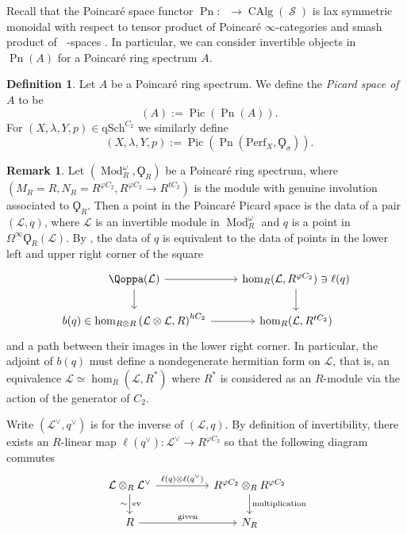 \documentclass{article}
\DeclareMathOperator{\CAlg}{CAlg} %
\DeclareMathOperator{\Catp}{Cat^p_\infty} %
\DeclareMathOperator{\Einfty}{\mathbf{E}_\infty} %
\DeclareMathOperator{\Mod}{Mod} %
\DeclareMathOperator{\Pic}{Pic} %
\DeclareMathOperator{\Picp}{Pic^p} %
\DeclareMathOperator{\Pn}{Pn} %
\DeclareMathOperator{\Spaces}{\mathcal{S}} %
\newcommand{\perf}{\mathrm{Perf}}
\theoremstyle{definition}
\newtheorem{definition}[equation]{Definition}
\newtheorem{remark}[equation]{Remark}
\newcommand{\Lucy}[1]{\todo[color=cyan!30]{\linespread{1}\footnotesize L: #1}}
\begin{document}
Recall that the Poincaré space functor $ \Pn \colon \Catp \to \CAlg(\Spaces) $ is lax symmetric monoidal with respect to tensor product of Poincaré $ \infty $-categories and smash product of $ \Einfty $-spaces \cite[Corollary 5.2.8]{CDHHLMNNSI}. In particular, we can consider invertible objects in $\Pn(A)$ for a Poincaré ring spectrum $A$.

\begin{definition}
    \label{definition:poincare_picard_space}
    Let $A$ be a Poincaré ring spectrum. We define the \emph{Picard space of $A$} to be $$\Picp(A):=\Pic(\Pn(A)).$$
    For $(X,\lambda, Y, p)\in \mathrm{qSch}^{C_2}$ we similarly define \[\Picp(X,\lambda,Y,p):= \Pic(\Pn(\perf_X,\Qoppa_{\sigma})).\]
\end{definition}

\begin{remark}
    \label{remark:poincare_picard_points_desc}
    Let $ \left(\Mod_R^\omega, \Qoppa_R \right)$ be a Poincaré ring spectrum, where $(M_R=R, N_R= R^{\varphi C_2}, R^{\varphi C_2}\to R^{tC_2})$ is the module with genuine involution associated to $ \Qoppa_R $. 
    Then a point in the Poincaré Picard space is the data of a pair $ (\mathcal{L}, q ) $, where $ \mathcal{L} $ is an invertible module in $ \Mod_R^\omega $ and $ q $ is a point in $ \Omega^\infty\Qoppa_R(\mathcal{L}) $. 
    By \cite[Proposition 1.3.11]{CDHHLMNNSI}, the data of $ q $ is equivalent to the data of points in the lower left and upper right corner of the square
    \begin{equation}
    \begin{tikzcd}
        \Qoppa(\mathcal{L}) \ar[r] \ar[d] & \hom_R(\mathcal{L}, R^{\varphi C_2}) \ni \ell(q) \ar[d] \\
        b(q) \in \hom_{R \otimes R}\left(\mathcal{L} \otimes \mathcal{L}, R\right)^{hC_2} \ar[r] & \hom_R(\mathcal{L}, R^{tC_2})
    \end{tikzcd}
    \end{equation} 
    and a path between their images in the lower right corner. 
    In particular, the adjoint of $ b(q) $ must define a nondegenerate hermitian form on $ \mathcal{L} $, that is, an equivalence $ \mathcal{L} \simeq \hom_{R}(\mathcal{L}, R^*) $ where $ R^* $ is considered as an $ R $-module via the action of the generator of $ C_2 $. \Lucy{add equivariance/symmetry data}

    Write $ (\mathcal{L}^\vee,q^\vee) $ is for the inverse of $ (\mathcal{L},q) $. 
    By definition of invertibility, there exists an $ R $-linear map $ \ell(q^\vee) \colon \mathcal{L}^\vee \to R^{\varphi C_2} $ so that the following diagram commutes
    \begin{equation}\label{diagram:pnpic_linear_part_condition}
    \begin{tikzcd}[column sep=huge]
        \mathcal{L} \otimes_R \mathcal{L}^\vee \ar[d,"\mathrm{ev}", "\sim"']  \ar[r,"{\ell(q) \otimes \ell(q^\vee)}"] & R^{\varphi C_2} \otimes_R R^{\varphi C_2} \ar[d,"\mathrm{multiplication}"] \\
        R \ar[r,"\mathrm{given}"] & N_R   
    \end{tikzcd}
    \end{equation} 
\end{remark}
\end{document}
